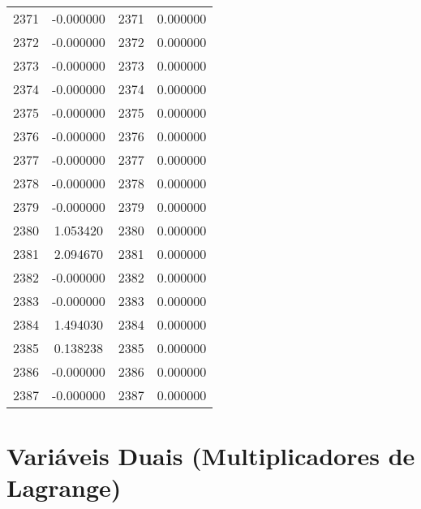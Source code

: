 \documentclass[12pt]{article}
\begin{document}
\begin{longtable}{@{}cccc@{}}
2371 & -0.000000 & 2371 & 0.000000 \\
2372 & -0.000000 & 2372 & 0.000000 \\
2373 & -0.000000 & 2373 & 0.000000 \\
2374 & -0.000000 & 2374 & 0.000000 \\
2375 & -0.000000 & 2375 & 0.000000 \\
2376 & -0.000000 & 2376 & 0.000000 \\
2377 & -0.000000 & 2377 & 0.000000 \\
2378 & -0.000000 & 2378 & 0.000000 \\
2379 & -0.000000 & 2379 & 0.000000 \\
2380 & 1.053420 & 2380 & 0.000000 \\
2381 & 2.094670 & 2381 & 0.000000 \\
2382 & -0.000000 & 2382 & 0.000000 \\
2383 & -0.000000 & 2383 & 0.000000 \\
2384 & 1.494030 & 2384 & 0.000000 \\
2385 & 0.138238 & 2385 & 0.000000 \\
2386 & -0.000000 & 2386 & 0.000000 \\
2387 & -0.000000 & 2387 & 0.000000 \\

\end{longtable}

\section{Variáveis Duais (Multiplicadores de Lagrange)}
\end{document}
